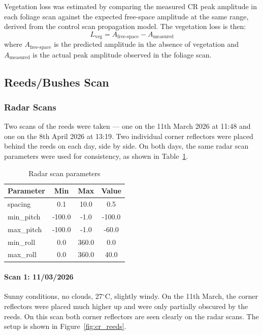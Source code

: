 Vegetation loss was estimated by comparing the measured CR peak amplitude in each
foliage scan against the expected free-space amplitude at the same range, derived
from the control scan propagation model.
The vegetation loss is then:
\[
  L_{\text{veg}} = A_{\text{free-space}} - A_{\text{measured}}
\]
where $A_{\text{free-space}}$ is the predicted amplitude in the absence of
vegetation and $A_{\text{measured}}$ is the actual peak amplitude observed in the
foliage scan.


\subsection{Reeds/Bushes Scan}

\subsubsection{Radar Scans}

Two scans of the reeds were taken — one on the 11th March 2026 at 11:48 and one
on the 8th April 2026 at 13:19.
Two individual corner reflectors were placed behind the reeds on each day, side by
side.
On both days, the same radar scan parameters were used for consistency, as shown
in Table~\ref{tab:scan_parameters}.

\begin{table}[H]
    \centering
    \begin{tabular}{lccc}
        \hline
        \textbf{Parameter} & \textbf{Min} & \textbf{Max} & \textbf{Value} \\
        \hline
        spacing    & 0.1    & 10.0  & 0.5    \\
        min\_pitch & -100.0 & -1.0  & -100.0 \\
        max\_pitch & -100.0 & -1.0  & -60.0  \\
        min\_roll  & 0.0    & 360.0 & 0.0    \\
        max\_roll  & 0.0    & 360.0 & 40.0   \\
        \hline
    \end{tabular}
    \caption{Radar scan parameters}
    \label{tab:scan_parameters}
\end{table}

\paragraph{Scan 1: 11/03/2026}
Sunny conditions, no clouds, 27$^\circ$C, slightly windy.
On the 11th March, the corner reflectors were placed much higher up and were only
partially obscured by the reeds.
On this scan both corner reflectors are seen clearly on the radar scans.
The setup is shown in Figure~\ref{fig:cr_reeds}.

